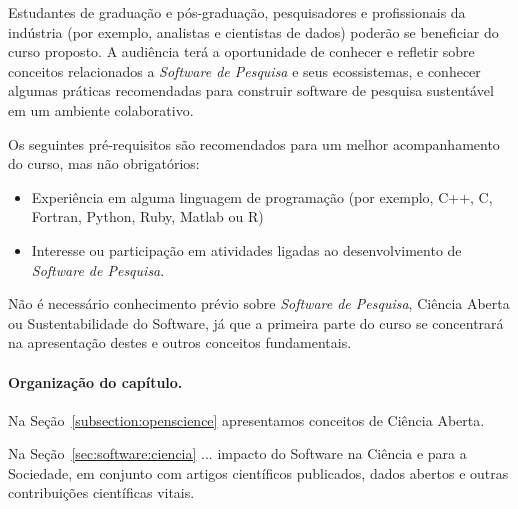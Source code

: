 Estudantes de graduação e pós-graduação, pesquisadores e profissionais da indústria (por exemplo, analistas e cientistas de dados) poderão se beneficiar do curso proposto.
A audiência terá a oportunidade de conhecer e refletir sobre conceitos relacionados a \textit{Software de Pesquisa} e seus ecossistemas, e conhecer algumas práticas recomendadas para construir software de pesquisa sustentável em um ambiente colaborativo.

Os seguintes pré-requisitos são recomendados para um melhor acompanhamento do curso, mas não obrigatórios:
\begin{itemize}
    \item Experiência em alguma linguagem de programação (por exemplo, C++, C, Fortran, Python, Ruby, Matlab ou R)
    \item Interesse ou participação em atividades ligadas ao desenvolvimento de \textit{Software de Pesquisa}.
\end{itemize}

Não é necessário conhecimento prévio sobre \textit{Software de Pesquisa}, Ciência Aberta ou Sustentabilidade do Software, já que a primeira parte do curso se concentrará na apresentação destes e outros conceitos fundamentais. 

\noindent\paragraph*{Organização do capítulo.}





Na Seção~\ref{subsection:openscience} apresentamos  conceitos de Ciência Aberta.

Na Seção~\ref{sec:software:ciencia} 
... impacto do Software na Ciência e para a Sociedade, em conjunto com artigos científicos publicados, dados abertos e outras contribuições científicas vitais.

